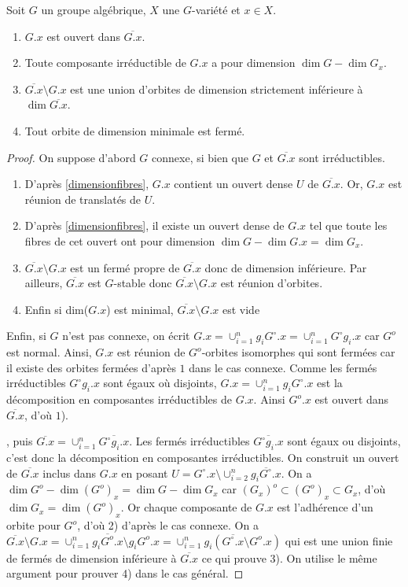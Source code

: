 \begin{prop}
Soit $G$ un groupe algébrique, $X$ une $G$-variété et $x\in X$.
\begin{enumerate}
\item $G.x$ est ouvert dans $\overline{G.x}$.
\item Toute composante irréductible de $G.x$ a pour dimension $\dim G-\dim G_x$.
\item $\overline{G.x}\setminus G.x$ est une union d'orbites de dimension strictement inférieure à $\dim \overline{G.x}$.
\item Tout orbite de dimension minimale est fermé.
\end{enumerate}
\end{prop}
\begin{proof}
On suppose d'abord $G$ connexe, si bien que $G$ et $\overline{G.x}$ sont irréductibles.
\begin{enumerate}
\item D'après \ref{dimensionfibres}, $G.x$ contient un ouvert dense $U$ de $\overline{G.x}$. Or, $G.x$ est réunion de translatés de $U$.
\item D'après \ref{dimensionfibres}, il existe un ouvert dense de $G.x$ tel que toute les fibres de cet ouvert ont pour dimension $\dim G-\dim G.x=\dim G_x$.
\item $\overline{G.x}\setminus G.x$ est un fermé propre de $\overline{G.x}$ donc de dimension inférieure. Par ailleurs, $\overline{G.x}$ est $G$-stable donc $\overline{G.x}\setminus G.x$ est réunion d'orbites.
\item Enfin si dim($G.x$) est minimal, $\overline{G.x}\setminus G.x$ est vide
\end{enumerate}
Enfin, si $G$ n'est pas connexe, on écrit $G.x=\cup_{i=1}^{n}g_iG^\circ .x=\cup_{i=1}^{n}G^\circ g_i.x$ car $G^o$ est normal. Ainsi, $G.x$ est réunion de $G^o$-orbites isomorphes qui sont fermées car il existe des orbites fermées d'après $1$ dans le cas connexe. Comme les fermés irréductibles $G^\circ g_i.x$ sont égaux où disjoints, $G.x=\cup_{i=1}^{n}g_iG^\circ .x$ est la décomposition en composantes irréductibles de $G.x$. Ainsi $G^o.x$ est ouvert dans $\overline{G.x}$, d'où $1$).


, puis $\overline{G.x}=\cup_{i=1}^{n}\overline{G^\circ g_i.x}$. Les fermés irréductibles $\overline{G^\circ g_i.x}$ sont égaux ou disjoints, c'est donc la décomposition en composantes irréductibles. On construit un ouvert de $\overline{G.x}$ inclus dans $G.x$ en posant $U=G^\circ .x\setminus \cup_{i=2}^{n}\overline{g_iG^\circ .x}$. On a $\dim G^o-\dim (G^o) _x=\dim G -\dim G_x$ car $(G_x)^o \subset(G^o)_x \subset G_x$, d'où $\dim G_x=\dim (G^o) _x$. Or chaque composante de $G.x$ est l'adhérence d'un orbite pour $G^o$, d'où 2) d'après le cas connexe. On a $\overline{G.x}\setminus G.x=\cup_{i=1}^{n}\overline{g_iG^o .x}\setminus g_iG^o .x=\cup_{i=1}^{n}g_i(\overline{G^\circ .x}\setminus G^o .x)$ qui est une union finie de fermés de dimension inférieure à $\overline{G .x}$ ce qui prouve 3). On utilise le même argument pour prouver 4) dans le cas général.
\end{proof}

